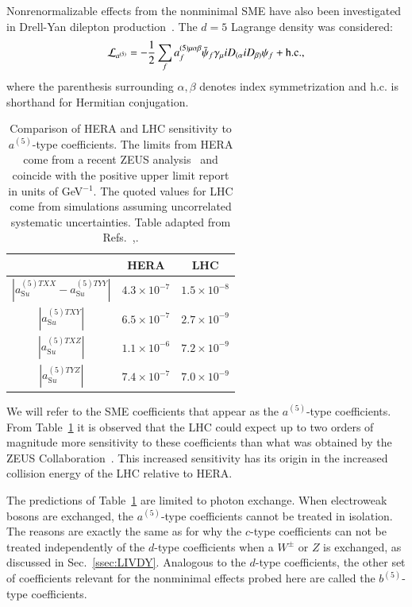 Nonrenormalizable effects from the nonminimal SME 
have also been investigated in 
Drell-Yan dilepton production~\cite{Kostelecky:2019fse}. 
The $d=5$ Lagrange density was considered:
%
\begin{equation}
{\cal L}_{a^{(5)}} = -\frac{1}{2}\sum_f a_f^{(5)\mu\alpha\beta}
\bar\psi_f \gamma_\mu iD_{(\alpha}iD_{\beta)}\psi_f + \text{h.c.},
\end{equation}
where the parenthesis surrounding $\alpha, \beta$ denotes index symmetrization
and h.c. is shorthand for Hermitian conjugation. 
%
\begin{table}[t]
\centering
\begin{tabular}{|c|c|c|}\hline
& {\textbf{HERA}} & {\textbf{LHC}} \\ \hline
 $|a^{(5)TXX}_{\text{S}u}- a^{(5)TYY}_{\text{S}u} |$& $4.3\times 10^{-7}$ & $1.5\times 10^{-8}$ \\
 $|a^{(5)TXY}_{\text{S}u}|$& $6.5\times 10^{-7}$ & $2.7\times 10^{-9}$ \\
 $|a^{(5)TXZ}_{\text{S}u}|$ & $1.1\times 10^{-6}$ & $7.2\times 10^{-9}$ \\
 $|a^{(5)TYZ}_{\text{S}u} |$&  $7.4\times 10^{-7}$ & $7.0\times 10^{-9}$ \\
\hline
\end{tabular}
\caption{Comparison of HERA and LHC sensitivity to $a^{(5)}$-type coefficients.
The limits from HERA come from a recent ZEUS analysis~\cite{ZEUS:2022msi} and coincide with the
positive upper limit report in units of GeV$^{-1}$. 
The quoted values for LHC come from simulations assuming uncorrelated
systematic uncertainties. Table adapted from Refs.~\cite{Kostelecky:2019fse},\cite{ZEUS:2022msi}.
\label{tablea5}}
\end{table}
%
We will refer to the SME coefficients that 
appear as the $a^{(5)}$-type coefficients. From Table~\ref{tablea5} 
it is observed that the LHC could expect up to two orders 
of magnitude more sensitivity to these coefficients than what was obtained
by the ZEUS Collaboration~\cite{ZEUS:2022msi}. This increased sensitivity
has its origin in the increased collision energy of the LHC relative to HERA.

The predictions of Table~\ref{tablea5} are limited to photon exchange. When
electroweak bosons are exchanged, the $a^{(5)}$-type coefficients cannot be treated in isolation.
The reasons are exactly the same as for why the $c$-type coefficients
can not be treated independently of the $d$-type coefficients when
a $W^\pm$ or $Z$ is exchanged, as discussed in Sec.~\ref{ssec:LIVDY}. 
Analogous to the $d$-type coefficients, the other set of coefficients
relevant for the nonminimal effects probed here are called the $b^{(5)}$-type 
coefficients. 


